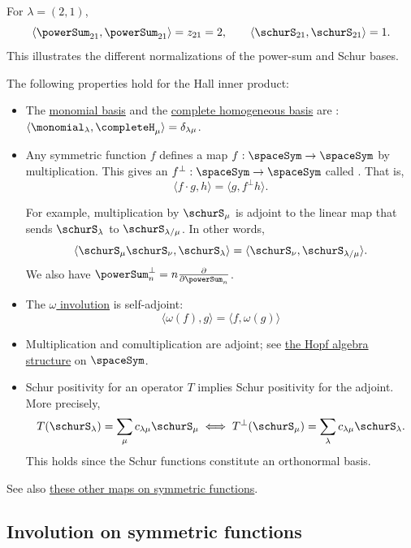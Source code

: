 \begin{example}
For $\lambda=(2,1)$,
\[
 \langle \powerSum_{21}, \powerSum_{21} \rangle
 = z_{21} = 2,
 \qquad
 \langle \schurS_{21}, \schurS_{21} \rangle = 1.
\]
This illustrates the different normalizations of the power-sum and Schur bases.
\end{example}

The following properties hold for the Hall inner product:
\begin{itemize}

\item The \hyperref[monomial]{monomial basis} and the
\hyperref[completeH]{complete homogeneous basis} are :
$\langle \monomial_\lambda, \completeH_\mu \rangle = \delta_{\lambda\mu}$.

\item Any symmetric function $f$ defines a map
$f:\spaceSym \to \spaceSym$ by multiplication.
This gives an  $f^{\perp}: \spaceSym \to \spaceSym$
called .
That is,
\[
\langle f\cdot g, h \rangle = \langle g, f^{\perp} h \rangle.
\]

For example, multiplication by $\schurS_\mu$ is adjoint to the linear map that
sends $\schurS_\lambda$ to $\schurS_{\lambda/\mu}$.
In other words,
\[
\langle \schurS_\mu \schurS_\nu, \schurS_{\lambda} \rangle
=
\langle \schurS_\nu, \schurS_{\lambda/\mu} \rangle.
\]
We also have $\powerSum_n^{\perp} = n \frac{\partial}{\partial \powerSum_n}$.


\item The \hyperref[standardInvolution]{$\omega$ involution} is self-adjoint:
\[
\langle \omega(f), g \rangle = \langle f, \omega(g) \rangle
\]


\item Multiplication and comultiplication are adjoint; see
\hyperref[hopfAlgebraSymmetricFunctions]{the Hopf algebra structure} on
$\spaceSym$.

\item Schur positivity for an operator $T$ implies Schur positivity for the
adjoint.  More precisely,
\[
T(\schurS_\lambda) = \sum_{\mu} c_{\lambda \mu} \schurS_\mu
\iff
T^{\perp}(\schurS_\mu) = \sum_{\lambda} c_{\lambda \mu} \schurS_\lambda.
\]
This holds since the Schur functions constitute an orthonormal basis.
\end{itemize}

See also \hyperref[mapsOnSymmetricFunctions]{these other maps on symmetric functions}.


\subsection[standardInvolution]{Involution on symmetric functions}

